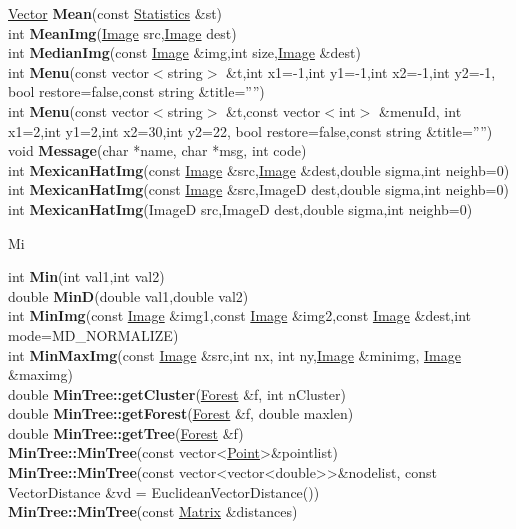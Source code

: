 \documentclass[10pt,titlepage]{article}
\def\functionlistentry#1#2#3#4#5#6{\noindent #1 {\bf #2}(#3) \dotfill #6\\}
\def\letterref#1{}
\def\letterlabel#1{\vspace{0.5cm}\centerline{\Large #1}}
\def\letterlabelend#1{}
\begin{document}
{{\letterref{Ma}
\letterref{Me}
\letterref{Mi}
\letterref{Mk}
\letterref{Mo}
\letterref{Mp}
\letterref{Mu}
\letterlabelend{Me}
\functionlistentry{\hyperlink{Vector}{Vector}}{Mean}{const \hyperlink{Statistics}{Statistics} \&st}{868}{statistics}{}
\functionlistentry{int}{MeanImg}{\hyperlink{Image}{Image} src,\hyperlink{Image}{Image} dest}{348}{filter}{}
\functionlistentry{int}{MedianImg}{const \hyperlink{Image}{Image} \&img,int size,\hyperlink{Image}{Image} \&dest}{386}{filter}{}
\functionlistentry{int}{Menu}{const vector$<$string$>$ \&t,int x1=-1,int y1=-1,int x2=-1,int y2=-1, bool restore=false,const string \&title=''''}{1447}{genericTools}{}
\functionlistentry{int}{Menu}{const vector$<$string$>$ \&t,const vector$<$int$>$ \&menuId, int x1=2,int y1=2,int x2=30,int y2=22, bool restore=false,const string \&title=''''}{1448}{genericTools}{}
\functionlistentry{void}{Message}{char *name, char *msg, int code}{1546}{errorHandling}{}
\functionlistentry{int}{MexicanHatImg}{const \hyperlink{Image}{Image} \&src,\hyperlink{Image}{Image} \&dest,double sigma,int neighb=0}{355}{filter}{}
\functionlistentry{int}{MexicanHatImg}{const \hyperlink{Image}{Image} \&src,ImageD dest,double sigma,int neighb=0}{356}{filter}{}
\functionlistentry{int}{MexicanHatImg}{ImageD src,ImageD dest,double sigma,int neighb=0}{357}{filter}{}

\letterlabel{Mi}
\letterref{A}
\letterref{B}
\letterref{C}
\letterref{D}
\letterref{E}
\letterref{F}
\letterref{G}
\letterref{H}
\letterref{I}
\letterref{K}
\letterref{L}
\letterref{M}
\letterref{N}
\letterref{O}
\letterref{P}
\letterref{Q}
\letterref{R}
\letterref{S}
\letterref{T}
\letterref{U}
\letterref{V}
\letterref{W}
\letterref{X}
\letterref{Y}
\letterref{Z}

\letterref{Ma}
\letterref{Me}
\letterref{Mi}
\letterref{Mk}
\letterref{Mo}
\letterref{Mp}
\letterref{Mu}
\letterlabelend{Mi}
\functionlistentry{int}{Min}{int val1,int val2}{1353}{numeric}{}
\functionlistentry{double}{MinD}{double val1,double val2}{1355}{numeric}{}
\functionlistentry{int}{MinImg}{const \hyperlink{Image}{Image} \&img1,const \hyperlink{Image}{Image} \&img2,const \hyperlink{Image}{Image} \&dest,int mode=MD\_NORMALIZE}{1091}{processing}{}
\functionlistentry{int}{MinMaxImg}{const \hyperlink{Image}{Image} \&src,int nx, int ny,\hyperlink{Image}{Image} \&minimg, \hyperlink{Image}{Image} \&maximg}{383}{filter}{}
\functionlistentry{double}{MinTree::getCluster}{\hyperlink{Forest}{Forest} \&f, int nCluster}{1294}{graph}{}
\functionlistentry{double}{MinTree::getForest}{\hyperlink{Forest}{Forest} \&f, double maxlen}{1293}{graph}{}
\functionlistentry{double}{MinTree::getTree}{\hyperlink{Forest}{Forest} \&f}{1292}{graph}{}
\functionlistentry{}{MinTree::MinTree}{const vector\textless {}\hyperlink{Point}{Point}\textgreater  \&pointlist}{1289}{graph}{}
\functionlistentry{}{MinTree::MinTree}{const vector\textless {}vector\textless {}double\textgreater  \textgreater  \&nodelist, const VectorDistance \&vd = EuclideanVectorDistance()}{1290}{graph}{}
\functionlistentry{}{MinTree::MinTree}{const \hyperlink{Matrix}{Matrix} \&distances}{1291}{graph}{}

}}
\end{document}
